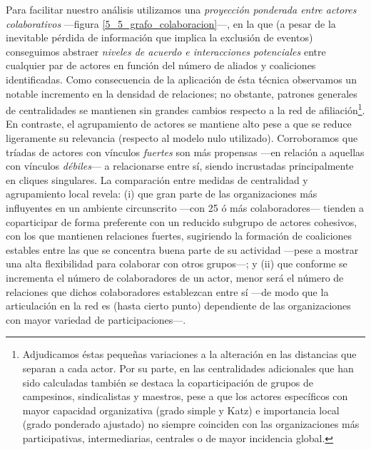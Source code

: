 \documentclass[letterpaper, 11pt]{book}
\theoremstyle{definition}
\theoremstyle{remark}
\begin{document}
Para facilitar nuestro análisis utilizamos una \emph{proyección ponderada entre actores colaborativos} ---figura \ref{5_5_grafo_colaboracion}---, en la que (a pesar de la inevitable pérdida de información que implica la exclusión de eventos) conseguimos abstraer \emph{niveles de acuerdo e interacciones potenciales} entre cualquier par de actores en función del número de aliados y coaliciones identificadas. 
Como consecuencia de la aplicación de ésta técnica observamos un notable incremento en la densidad de relaciones; no obstante, patrones generales de centralidades se mantienen sin grandes cambios respecto a la red de afiliación\footnote{
    Adjudicamos éstas pequeñas variaciones a la alteración en las distancias que separan a cada actor. 
    Por su parte, en las centralidades adicionales que han sido calculadas también se destaca la coparticipación de grupos de campesinos, sindicalistas y maestros, pese a que los actores específicos con mayor capacidad organizativa (grado simple y Katz) e importancia local (grado ponderado ajustado) no siempre coinciden con las organizaciones más participativas, intermediarias, centrales o de mayor incidencia global. 
}. 
En contraste, el agrupamiento de actores se mantiene alto pese a que se reduce ligeramente su relevancia (respecto al modelo nulo utilizado). 
Corroboramos que tríadas de actores con vínculos \emph{fuertes} son más propensas ---en relación a aquellas con vínculos \emph{débiles}--- a relacionarse entre sí, siendo incrustadas principalmente en cliques singulares. 
La comparación entre medidas de centralidad y agrupamiento local revela: 
(i) que gran parte de las organizaciones más influyentes en un ambiente circunscrito ---con 25 ó más colaboradores--- tienden a coparticipar de forma preferente con un reducido subgrupo de actores cohesivos, con los que mantienen relaciones fuertes, sugiriendo la formación de coaliciones estables entre las que se concentra buena parte de su actividad ---pese a mostrar una alta flexibilidad para colaborar con otros grupos---; 
y (ii) que conforme se incrementa el número de colaboradores de un actor, menor será el número de relaciones que dichos colaboradores establezcan entre sí ---de modo que la articulación en la red es (hasta cierto punto) dependiente de las organizaciones con mayor variedad de participaciones---. 
\end{document}
